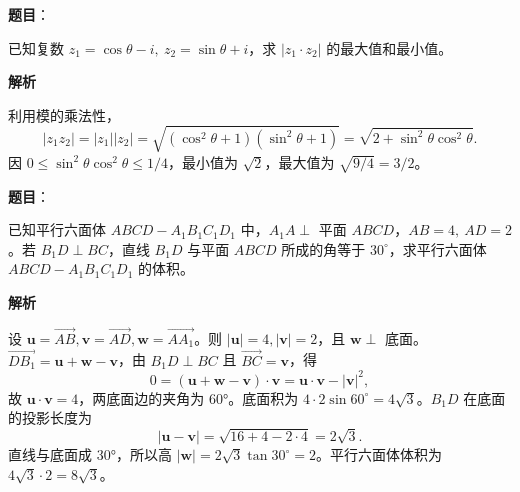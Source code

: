 \begin{answer}

\textbf{题目}：

已知复数 \(z_1=\cos\theta-i,\ z_2=\sin\theta+i\)，求 \(|z_1\cdot z_2|\) 的最大值和最小值。

\textbf{解析}

利用模的乘法性，
\nopagebreak[4]
\[
|z_1z_2|=|z_1||z_2|=\sqrt{(\cos^2\theta+1)(\sin^2\theta+1)}
=\sqrt{2+\sin^2\theta\cos^2\theta}.
\]
因 \(0\le\sin^2\theta\cos^2\theta\le1/4\)，最小值为 \(\sqrt2\)，最大值为 \(\sqrt{9/4}=3/2\)。


\end{answer}
\begin{answer}

\textbf{题目}：

已知平行六面体 \(ABCD-A_1B_1C_1D_1\) 中，\(A_1A\perp\) 平面 \(ABCD\)，\(AB=4,\ AD=2\)。若 \(B_1D\perp BC\)，直线 \(B_1D\) 与平面 \(ABCD\) 所成的角等于 \(30^\circ\)，求平行六面体 \(ABCD-A_1B_1C_1D_1\) 的体积。
\nopagebreak[4]
\begin{center}\end{center}
\nopagebreak[4]
\textbf{解析}

设 \(\mathbf u=\overrightarrow{AB},\mathbf v=\overrightarrow{AD},\mathbf w=\overrightarrow{AA_1}\)。则 \(|\mathbf u|=4,|\mathbf v|=2\)，且 \(\mathbf w\perp\) 底面。\(\overrightarrow{DB_1}=\mathbf u+\mathbf w-\mathbf v\)，由 \(B_1D\perp BC\) 且 \(\overrightarrow{BC}=\mathbf v\)，得
\nopagebreak[4]
\[
0=(\mathbf u+\mathbf w-\mathbf v)\cdot\mathbf v=\mathbf u\cdot\mathbf v-|\mathbf v|^2,
\]
故 \(\mathbf u\cdot\mathbf v=4\)，两底面边的夹角为 60°。底面积为
\(4\cdot2\sin60^\circ=4\sqrt3\)。\(B_1D\) 在底面的投影长度为
\nopagebreak[4]
\[
|\mathbf u-\mathbf v|=\sqrt{16+4-2\cdot4}=2\sqrt3.
\]
直线与底面成 30°，所以高 \(|\mathbf w|=2\sqrt3\tan30^\circ=2\)。平行六面体体积为 \(4\sqrt3\cdot2=8\sqrt3\)。


\end{answer}
